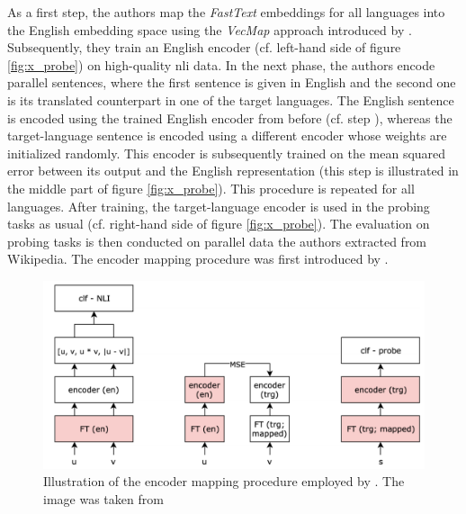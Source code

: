  As a first step, the authors map the \textit{FastText} embeddings for all languages into the English embedding space using the \textit{VecMap} approach introduced by \citep{Artetxe.2016}.  Subsequently, they train an English encoder (cf. left-hand side of figure \vref{fig:x_probe}) on high-quality \gls{nli} data.  In the next phase, the authors encode parallel sentences, where the first sentence is given in English and the second one is its translated counterpart in one of the target languages. The English sentence is encoded using the trained English encoder from before (cf. step ), whereas the target-language sentence is encoded using a different encoder whose weights are initialized randomly. This encoder is subsequently trained on the mean squared error between its output and the English representation (this step is illustrated in the middle part of figure \vref{fig:x_probe}). This procedure is repeated for all languages.  After training, the target-language encoder is used in the probing tasks as usual (cf. right-hand side of figure \vref{fig:x_probe}). The evaluation on probing tasks is then conducted on parallel data the authors extracted from Wikipedia. The encoder mapping procedure was first introduced by \citep{Conneau.2018c}.

\begin{figure}[h]
	\centering
	\includegraphics[scale=0.35]{images/x_probe}
	\caption[Encoder mapping procedure employed by Ravishankar and colleagues]
		{Illustration of the encoder mapping procedure employed by \citep{Ravishankar.2019}.
		The image was taken from \citep{Ravishankar.2019}}
	\label{fig:x_probe}
\end{figure}

